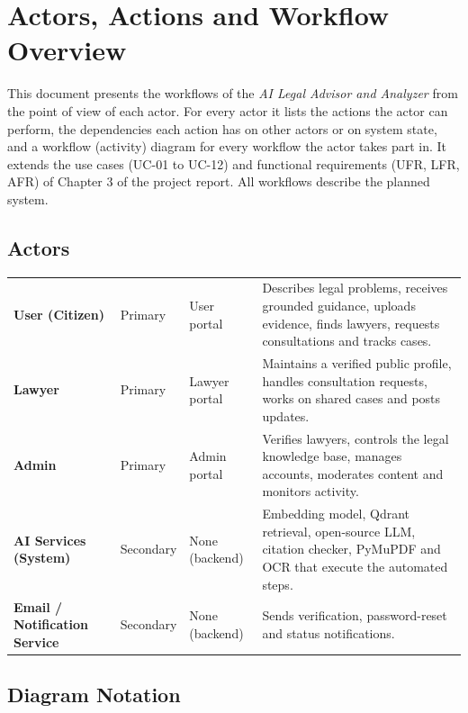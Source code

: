 \chapter{Actors, Actions and Workflow Overview}\label{ch:1}

This document presents the workflows of the \emph{AI Legal Advisor and Analyzer} from the point of view of each actor. For every actor it lists the actions the actor can perform, the dependencies each action has on other actors or on system state, and a workflow (activity) diagram for every workflow the actor takes part in. It extends the use cases (UC-01 to UC-12) and functional requirements (UFR, LFR, AFR) of Chapter 3 of the project report. All workflows describe the planned system.

\section{Actors}

\begin{center}
\begin{tabular}{|L{2.23cm}|L{1.70cm}|L{1.70cm}|L{8.38cm}|}
\hline\headrow {} &  &  &  \\ \hline
\textbf{User (Citizen)} & Primary & User portal & Describes legal problems, receives grounded guidance, uploads evidence, finds lawyers, requests consultations and tracks cases. \\ \hline
\textbf{Lawyer} & Primary & Lawyer portal & Maintains a verified public profile, handles consultation requests, works on shared cases and posts updates. \\ \hline
\textbf{Admin} & Primary & Admin portal & Verifies lawyers, controls the legal knowledge base, manages accounts, moderates content and monitors activity. \\ \hline
\textbf{AI Services (System)} & Secondary & None (backend) & Embedding model, Qdrant retrieval, open-source LLM, citation checker, PyMuPDF and OCR that execute the automated steps. \\ \hline
\textbf{Email / Notification Service} & Secondary & None (backend) & Sends verification, password-reset and status notifications. \\ \hline
\end{tabular}
\end{center}

\section{Diagram Notation}

